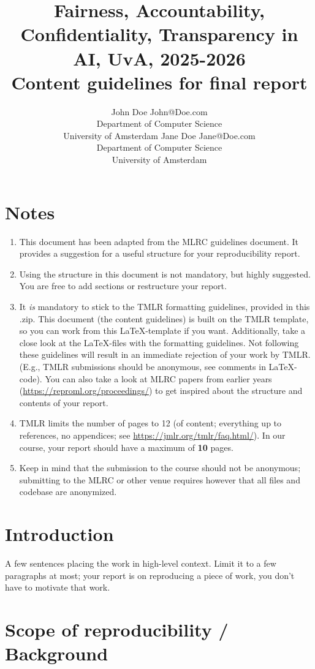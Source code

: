 \documentclass[10pt]{article} %
\title{Fairness, Accountability, Confidentiality, Transparency in AI, UvA, 2025-2026 \\
Content guidelines for final report}
\author{\name John Doe \email John@Doe.com \\
      \addr Department of Computer Science\\
      University of Amsterdam
      \AND
      \name Jane Doe \email Jane@Doe.com \\
      \addr Department of Computer Science\\
      University of Amsterdam}
\begin{document}
	
	
	\maketitle

    \section*{Notes}
    \begin{enumerate}
    	\item This document has been adapted from the MLRC guidelines document. It provides a suggestion for a useful structure for your reproducibility report. 
    	\item Using the structure in this document is not mandatory, but highly suggested. You are free to add sections or restructure your report. 
    	\item It \textit{is} mandatory to stick to the TMLR formatting guidelines, provided in this .zip. This document (the content guidelines) is built on the TMLR template, so you can work from this LaTeX-template if you want. Additionally, take a close look at the LaTeX-files with the formatting guidelines. Not following these guidelines will result in an immediate rejection of your work by TMLR. (E.g., TMLR submissions should be anonymous, see comments in LaTeX-code). You can also take a look at MLRC papers from earlier years (\url{https://reproml.org/proceedings/}) to get inspired about the structure and contents of your report. 
    	\item TMLR limits the number of pages to 12 (of content; everything up to references, no appendices; see \url{https://jmlr.org/tmlr/faq.html/}). In our course, your report should have a maximum of \textbf{10} pages.
        \item Keep in mind that the submission to the course should not be anonymous; submitting to the MLRC or other venue requires however that all files and codebase are anonymized. 
    \end{enumerate}

	\section{Introduction}
	A few sentences placing the work in high-level context. Limit it to a few paragraphs at most; your report is on reproducing a piece of work, you don’t have to motivate that work.
	
	\section{Scope of reproducibility / Background}
	\label{sec:claims}
	
\end{document}
